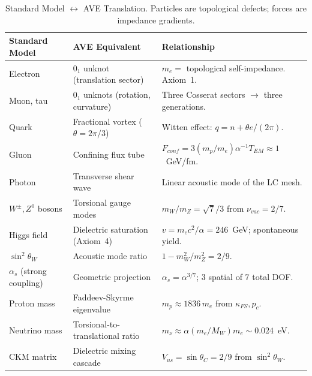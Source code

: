 %

\begin{table}[H]
\centering
\caption{Standard Model $\leftrightarrow$ AVE Translation.  Particles are topological defects; forces are impedance gradients.}
\label{tab:trans_particle}
\small
\renewcommand{\arraystretch}{1.3}
\begin{tabular}{@{}p{3.8cm} p{4.0cm} p{5.8cm}@{}}
\toprule
\textbf{Standard Model} & \textbf{AVE Equivalent} & \textbf{Relationship} \\
\midrule
Electron & $0_1$ unknot (translation sector) & $m_e = $ topological self-impedance. Axiom~1. \\
Muon, tau & $0_1$ unknots (rotation, curvature) & Three Cosserat sectors $\to$ three generations. \\
Quark & Fractional vortex ($\theta = 2\pi/3$) & Witten effect: $q = n + \theta e/(2\pi)$. \\
Gluon & Confining flux tube & $F_{conf} = 3(m_p/m_e)\alpha^{-1}T_{EM} \approx 1$~GeV/fm. \\
Photon & Transverse shear wave & Linear acoustic mode of the LC mesh. \\
$W^\pm, Z^0$ bosons & Torsional gauge modes & $m_W/m_Z = \sqrt{7}/3$ from $\nu_{vac} = 2/7$. \\
Higgs field & Dielectric saturation (Axiom~4) & $v = m_ec^2/\alpha = 246$~GeV; spontaneous yield. \\
$\sin^2\theta_W$ & Acoustic mode ratio & $1 - m_W^2/m_Z^2 = 2/9$. \\
$\alpha_s$ (strong coupling) & Geometric projection & $\alpha_s = \alpha^{3/7}$; 3 spatial of 7 total DOF. \\
Proton mass & Faddeev-Skyrme eigenvalue & $m_p \approx 1836\,m_e$ from $\kappa_{FS}, p_c$. \\
Neutrino mass & Torsional-to-translational ratio & $m_\nu \approx \alpha(m_e/M_W)m_e \sim 0.024$~eV. \\
CKM matrix & Dielectric mixing cascade & $V_{us} = \sin\theta_C = 2/9$ from $\sin^2\theta_W$. \\
\bottomrule
\end{tabular}
\end{table}
